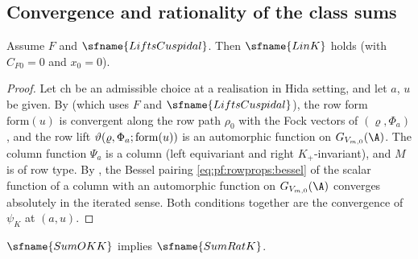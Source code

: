 \subsection{Convergence and rationality of the class sums}\label{sec:pf:rowprops:sumrat}

\begin{proposition}[Convergence]\label{pf:rowprops:linK}
Assume $F$ and $\sfname{LiftsCuspidal}$. Then $\sfname{LinK}$ holds (with $C_{F0}=0$ and $x_0=0$).
\end{proposition}

\begin{proof}
Let $\mathrm{ch}$ be an admissible choice at a realisation in Hida setting, and let $a$, $u$ be given.
By  (which uses $F$ and $\sfname{LiftsCuspidal}$), the row form
$\mathrm{form}(u)$ is convergent along the row path $\rho_0$ with the Fock vectors of $(\varrho,\Phi_a)$, and the row lift
$\vartheta(\varrho,\Phi_a;\mathrm{form}(u))$ is an automorphic function on $G_{V_{m,0}}(\A)$. The column function $\Psi_a$ is
a column (left equivariant and right $K_+$-invariant), and $M$ is of row type. By
, the Bessel pairing \eqref{eq:pf:rowprops:bessel} of the
scalar function of a column with an automorphic function on $G_{V_{m,0}}(\A)$ converges absolutely in the iterated sense.
Both conditions together are the convergence of $\psi_K$ at $(a,u)$.
\end{proof}

\begin{proposition}\label{pf:rowprops:sumrat}
$\sfname{SumOKK}$ implies $\sfname{SumRatK}$.
\end{proposition}

